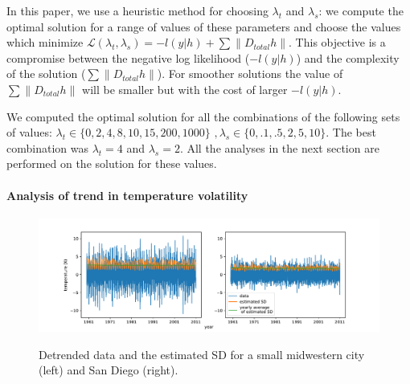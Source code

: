 \documentclass{article}
\begin{document}
In this paper, we use a heuristic method for choosing $\lambda_t$ and
$\lambda_s$: we compute the optimal solution for a range of values of
these parameters and choose the values which minimize
$\mathscr{L}(\lambda_t,\lambda_s)=-l(y|h)+ \sum \lVert D_{total}h
\lVert$. This objective is a compromise between the negative log
likelihood ($-l(y|h)$) and the complexity of the solution ($\sum
\lVert D_{total}h \lVert$). For smoother solutions the value of $\sum
\lVert D_{total}h \lVert$ will be smaller but with the cost of larger
$-l(y|h)$. 

We computed the optimal solution for all the combinations of the
following sets of values: $\lambda_t \in \{0,2,4,8,10,15,200,1000\} \, \, ,
\lambda_s \in \{0,.1,.5,2,5,10\}$. The best combination was
$\lambda_t=4$ and $\lambda_s=2$. All the analyses in the next section
are performed on the solution for these values.  


\paragraph{Analysis of trend in temperature volatility}

\begin{figure}[tb]
  \centering
  \includegraphics[width=.9 \columnwidth]{Figures/ts_estimatedVar}\\
  \caption{Detrended data and the estimated SD for
    a small midwestern city (left) and San Diego (right).} 
  \label{fig:avg_change_estimatedSD}
\end{figure} 
\end{document}
